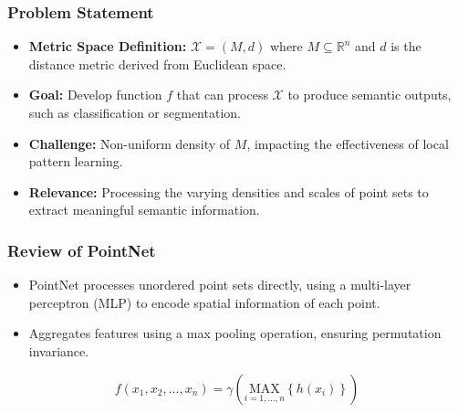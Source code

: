\documentclass[11pt,xcolor={dvipsnames},hyperref={pdftex,pdfpagemode=UseNone,hidelinks,pdfdisplaydoctitle=true},usepdftitle=false]{beamer}
\begin{document}
\begin{frame}
\frametitle{Problem Statement}
\begin{itemize}
  \item \textbf{Metric Space Definition:} $\mathcal{X}=(M, d)$ where $M \subseteq \mathbb{R}^n$ and $d$ is the distance metric derived from Euclidean space.
  \item \textbf{Goal:} Develop function $f$ that can process $\mathcal{X}$ to produce semantic outputs, such as classification or segmentation.
  \item \textbf{Challenge:} Non-uniform density of $M$, impacting the effectiveness of local pattern learning.
  \item \textbf{Relevance:} Processing the varying densities and scales of point sets to extract meaningful semantic information.
\end{itemize}
\end{frame}


\begin{frame}
\frametitle{Review of PointNet}
\begin{itemize}
  \item PointNet processes unordered point sets directly, using a multi-layer perceptron (MLP) to encode spatial information of each point.
  \item Aggregates features using a max pooling operation, ensuring permutation invariance.
\end{itemize}
\begin{equation}
    f(x_1, x_2, ..., x_n) = \gamma\left(\underset{i=1,...,n}{\mbox{MAX}}\left\{h(x_i)\right\}\right)
\end{equation}
\end{frame}
\end{document}
